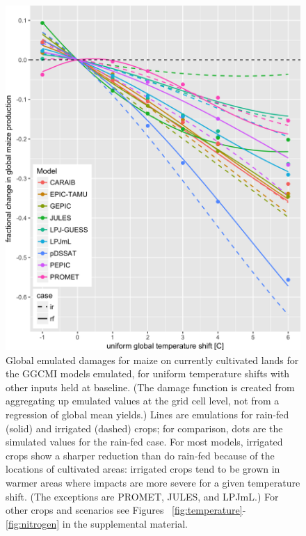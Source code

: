 \documentclass[preprint, 5p, times, twocolumn]{elsarticle}
\begin{document}
{\begin{figure}[!htb]
    \centering
    \includegraphics[width=0.95\linewidth]{figures/global_em_maize.png}
    \caption{Global emulated damages for maize on currently cultivated lands for the GGCMI models emulated, for uniform temperature shifts with other inputs held at baseline. (The damage function is created from aggregating up emulated values at the grid cell level, not from a regression of global mean yields.) Lines are emulations for rain-fed (solid) and irrigated (dashed) crops; for comparison, dots are the simulated values for the rain-fed case.  For most models, irrigated crops show a sharper reduction than do rain-fed because of the locations of cultivated areas: irrigated crops tend to be grown in warmer areas where impacts are more severe for a given temperature shift. (The exceptions are PROMET, JULES, and LPJmL.) For other crops and scenarios see Figures ~\ref{fig:temperature}- \ref{fig:nitrogen} in the supplemental material.}
    \label{fig:globe_em}
\end{figure}

}
\end{document}
